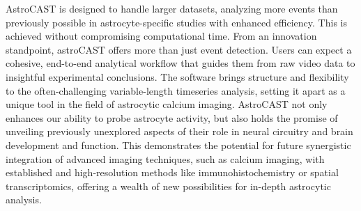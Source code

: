 AstroCAST is designed to handle larger datasets, analyzing more events than previously possible in astrocyte-specific studies with enhanced efficiency. This is achieved without compromising computational time. From an innovation standpoint, astroCAST offers more than just event detection. Users can expect a cohesive, end-to-end analytical workflow that guides them from raw video data to insightful experimental conclusions. The software brings structure and flexibility to the often-challenging variable-length timeseries analysis, setting it apart as a unique tool in the field of astrocytic calcium imaging. AstroCAST not only enhances our ability to probe astrocyte activity, but also holds the promise of unveiling previously unexplored aspects of their role in neural circuitry and brain development and function. This demonstrates the potential for future synergistic integration of advanced imaging techniques, such as calcium imaging, with established and high-resolution methods like immunohistochemistry or spatial transcriptomics, offering a wealth of new possibilities for in-depth astrocytic analysis.
